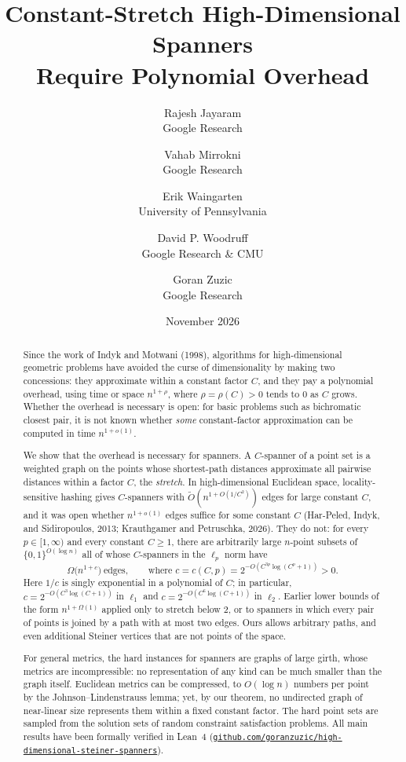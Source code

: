 \documentclass[11pt]{article}
\title{\textbf{Constant-Stretch High-Dimensional Spanners\\Require Polynomial Overhead}}
\author{
  Rajesh Jayaram\\[-2pt] {\small Google Research} \and
  Vahab Mirrokni\\[-2pt] {\small Google Research} \and
  Erik Waingarten\\[-2pt] {\small University of Pennsylvania} \and
  David P. Woodruff\\[-2pt] {\small Google Research \& CMU} \and
  Goran Zuzic\\[-2pt] {\small Google Research}
}
\date{November 2026}
\theoremstyle{definition}
\theoremstyle{remark}
\begin{document}
\maketitle
\begin{abstract}
Since the work of Indyk and Motwani (1998), algorithms for high-dimensional geometric problems have avoided the curse of dimensionality by making two concessions: they approximate within a constant factor $C$, and they pay a polynomial overhead, using time or space $n^{1 + \rho}$, where $\rho = \rho(C) > 0$ tends to $0$ as $C$ grows. Whether the overhead is necessary is open: for basic problems such as bichromatic closest pair, it is not known whether \emph{some} constant-factor approximation can be computed in time $n^{1 + o(1)}$.

We show that the overhead is necessary for spanners. A $C$-spanner of a point set is a weighted graph on the points whose shortest-path distances approximate all pairwise distances within a factor $C$, the \emph{stretch}. In high-dimensional Euclidean space, locality-sensitive hashing gives $C$-spanners with $\tilde{O}(n^{1 + O(1/C^2)})$ edges for large constant $C$, and it was open whether $n^{1 + o(1)}$ edges suffice for some constant $C$ (Har-Peled, Indyk, and Sidiropoulos, 2013; Krauthgamer and Petruschka, 2026). They do not: for every $p \in [1, \infty)$ and every constant $C \ge 1$, there are arbitrarily large $n$-point subsets of $\{0, 1\}^{O(\log n)}$ all of whose $C$-spanners in the $\ell_p$ norm have
\[
\Omega\bigl(n^{1 + c}\bigr) \ \text{edges}, \qquad \text{where } c = c(C, p) = 2^{-O(C^{3p}\log(C^p + 1))} > 0.
\]
Here $1/c$ is singly exponential in a polynomial of $C$; in particular, $c = 2^{-O(C^3 \log(C + 1))}$ in $\ell_1$ and $c = 2^{-O(C^6 \log(C + 1))}$ in $\ell_2$. Earlier lower bounds of the form $n^{1 + \Omega(1)}$ applied only to stretch below $2$, or to spanners in which every pair of points is joined by a path with at most two edges. Ours allows arbitrary paths, and even additional Steiner vertices that are not points of the space.

For general metrics, the hard instances for spanners are graphs of large girth, whose metrics are incompressible: no representation of any kind can be much smaller than the graph itself. Euclidean metrics can be compressed, to $O(\log n)$ numbers per point by the Johnson--Lindenstrauss lemma; yet, by our theorem, no undirected graph of near-linear size represents them within a fixed constant factor. The hard point sets are sampled from the solution sets of random constraint satisfaction problems. All main results have been formally verified in Lean~4 (\href{https://github.com/goranzuzic/high-dimensional-steiner-spanners}{\texttt{github.com/\allowbreak goranzuzic/\allowbreak high-\allowbreak dimensional-\allowbreak steiner-\allowbreak spanners}}).
\end{abstract}
\end{document}
